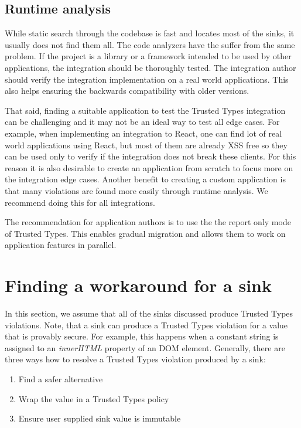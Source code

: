 \subsection{Runtime analysis}

While static search through the codebase is fast and locates most of the sinks, it usually does not
find them all. The code analyzers have the suffer from the same problem. If the project is a library
or a framework intended to be used by other applications, the integration should be thoroughly
tested. The integration author should verify the integration implementation on a real world
applications. This also helps ensuring the backwards compatibility with older versions.

That said, finding a suitable application to test the Trusted Types integration can be challenging
and it may not be an ideal way to test all edge cases. For example, when implementing an integration
to React, one can find lot of real world applications using React, but most of them are already XSS
free so they can be used only to verify if the integration does not break these clients. For this
reason it is also desirable to create an application from scratch to focus more on the integration
edge cases. Another benefit to creating a custom application is that many violations are found more
easily through runtime analysis. We recommend doing this for all integrations.

The recommendation for application authors is to use the the report only mode of Trusted Types. This
enables gradual migration and allows them to work on application features in parallel.

\section{Finding a workaround for a sink}

In this section, we assume that all of the sinks discussed produce Trusted Types violations. Note,
that a sink can produce a Trusted Types violation for a value that is provably secure. For example,
this happens when a constant string is assigned to an \emph{innerHTML} property of an DOM element.
Generally, there are three ways how to resolve a Trusted Types violation produced by a sink:

\begin{enumerate}
  \item Find a safer alternative
  \item Wrap the value in a Trusted Types policy
  \item Ensure user supplied sink value is immutable
\end{enumerate}


